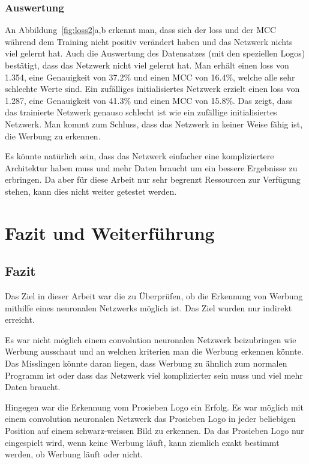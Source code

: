 \documentclass[12pt,a4paper]{report}
\begin{document}
\subsection{Auswertung}
An Abbildung~\ref{fig:loss2}a,b erkennt man,
dass sich der loss und der MCC während dem Training nicht positiv verändert haben und das Netzwerk nichts viel gelernt hat.
Auch die Auswertung des Datensatzes (mit den speziellen Logos) bestätigt, dass das Netzwerk nicht viel gelernt hat.
Man erhält einen loss von 1.354, eine Genauigkeit von 37.2\% und einen MCC von 16.4\%, welche alle sehr schlechte Werte sind.
Ein zufälliges initialisiertes Netzwerk  erzielt einen loss von 1.287, eine Genauigkeit von 41.3\% und einen MCC von 15.8\%.
Das zeigt, dass das trainierte Netzwerk genauso schlecht ist wie ein zufällige initialisiertes Netzwerk.
Man kommt zum Schluss, dass das Netzwerk in keiner Weise fähig ist, die Werbung zu erkennen.

Es könnte natürlich sein, dass das Netzwerk einfacher eine kompliziertere Architektur haben muss und mehr Daten braucht um ein bessere Ergebnisse zu erbringen.
Da aber für diese Arbeit nur sehr begrenzt Ressourcen zur Verfügung stehen, kann dies nicht weiter getestet werden.


\chapter{Fazit und Weiterführung}\label{ch:fazitUndWeiterführung}
\section{Fazit}
Das Ziel in dieser Arbeit war die zu Überprüfen, ob die Erkennung von Werbung mithilfe eines neuronalen Netzwerks möglich ist.
Das Ziel wurden nur indirekt erreicht.

Es war nicht möglich einem convolution neuronalen Netzwerk beizubringen wie Werbung ausschaut und an welchen kriterien man die Werbung erkennen könnte.
Das Misslingen könnte daran liegen, dass Werbung zu ähnlich zum normalen Programm ist oder dass das Netzwerk viel komplizierter sein muss und viel mehr Daten braucht.

Hingegen war die Erkennung vom Prosieben Logo ein Erfolg.
Es war möglich mit einem convolution neuronalen Netzwerk das Prosieben Logo in jeder beliebigen Position auf einem schwarz-weissen Bild zu erkennen.
Da das Prosieben Logo nur eingespielt wird, wenn keine Werbung läuft,
kann ziemlich exakt bestimmt werden, ob Werbung läuft oder nicht.
\end{document}

